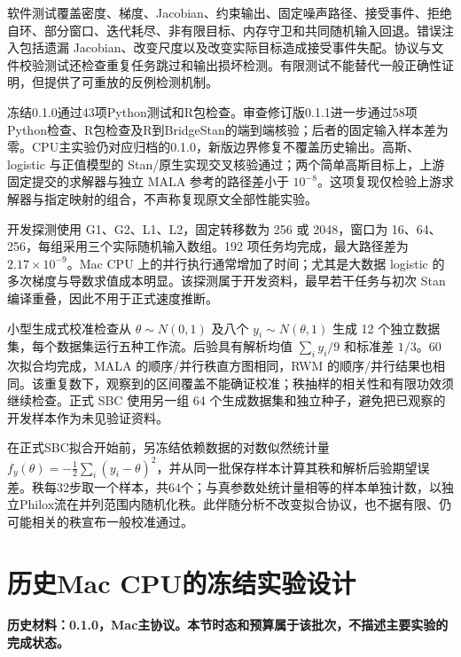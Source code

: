 \documentclass[UTF8,fontset=fandol,zihao=-4]{ctexart}
\begin{document}
软件测试覆盖密度、梯度、Jacobian、约束输出、固定噪声路径、接受事件、拒绝自环、部分窗口、迭代耗尽、非有限目标、内存守卫和共同随机输入回退。错误注入包括遗漏 Jacobian、改变尺度以及改变实际目标造成接受事件失配。协议与文件校验测试还检查重复任务跳过和输出损坏检测。有限测试不能替代一般正确性证明，但提供了可重放的反例检测机制。

冻结0.1.0通过43项Python测试和R包检查。审查修订版0.1.1进一步通过58项Python检查、R包检查及R到BridgeStan的端到端核验；后者的固定输入样本差为零。CPU主实验仍对应归档的0.1.0，新版边界修复不覆盖历史输出。高斯、logistic 与正值模型的 Stan/原生实现交叉核验通过；两个简单高斯目标上，上游固定提交的求解器与独立 MALA 参考的路径差小于 $10^{-8}$。这项复现仅检验上游求解器与指定映射的组合，不声称复现原文全部性能实验。

开发探测使用 G1、G2、L1、L2，固定转移数为 256 或 2048，窗口为 16、64、256，每组采用三个实际随机输入数组。192 项任务均完成，最大路径差为 $2.17\times10^{-9}$。Mac CPU 上的并行执行通常增加了时间；尤其是大数据 logistic 的多次梯度与导数求值成本明显。该探测属于开发资料，最早若干任务与初次 Stan 编译重叠，因此不用于正式速度推断。

小型生成式校准检查从 $\theta\sim N(0,1)$ 及八个 $y_i\sim N(\theta,1)$ 生成 12 个独立数据集，每个数据集运行五种工作流。后验具有解析均值 $\sum_i y_i/9$ 和标准差 $1/3$。60 次拟合均完成，MALA 的顺序/并行秩直方图相同，RWM 的顺序/并行结果也相同。该重复数下，观察到的区间覆盖不能确证校准；秩抽样的相关性和有限功效须继续检查。正式 SBC 使用另一组 64 个生成数据集和独立种子，避免把已观察的开发样本作为未见验证资料。

在正式SBC拟合开始前，另冻结依赖数据的对数似然统计量 $f_y(\theta)=-\tfrac12\sum_i(y_i-\theta)^2$，并从同一批保存样本计算其秩和解析后验期望误差。秩每32步取一个样本，共64个；与真参数处统计量相等的样本单独计数，以独立Philox流在并列范围内随机化秩。此伴随分析不改变拟合协议，也不据有限、仍可能相关的秩宣布一般校准通过。

\section{历史Mac CPU的冻结实验设计}
\noindent\textbf{历史材料：0.1.0，Mac主协议。本节时态和预算属于该批次，不描述主要实验的完成状态。}
\end{document}

